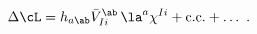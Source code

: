 \begin{equation}
  \Delta \cL = h_{a\ab} \bar{V}_{Ii}^\ab\, \la^a \chi^{Ii} + \text{c.c.}
  + \dots\ .
 \end{equation}

